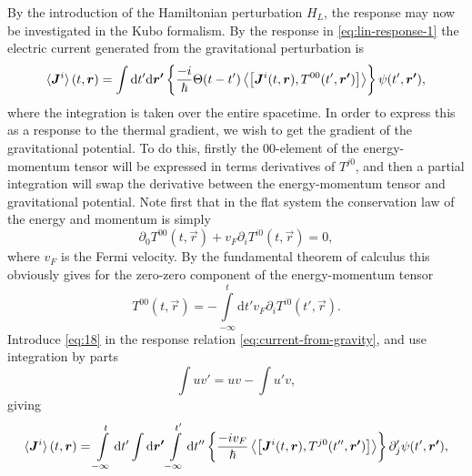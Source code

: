 By the introduction of the Hamiltonian perturbation $H_L$, the response may now be investigated in the Kubo formalism.
By the response in \cref{eq:lin-response-1} the electric current generated from the gravitational perturbation is
\begin{equation}
  \label{eq:current-from-gravity}
  \braket{\bm{J}^i}(t, \bm{r}) =
\int \mathrm{d}t' \mathrm{d} \bm{r'} \left\{
  \frac{-i}{\hbar} \Theta(t-t') \Braket{\left[
\bm{J}^i(t, \bm{r}), T^{00}(t', \bm{r'})
    \right]}
\right\} 
\psi (t', \bm{r'}),
\end{equation}
where the integration is taken over the entire spacetime.
In order to express this as a response to the thermal gradient, we wish to get the gradient of the gravitational potential.
To do this, firstly the $00$-element of the energy-momentum tensor will be expressed in terms derivatives of $T^{j0}$, and then a partial integration will swap the derivative between the energy-momentum tensor and gravitational potential.
Note first that in the flat system the conservation law of the  energy and momentum is simply
\begin{equation}
  \partial _0 T^{00}(t, \vec{r}) + v_F \partial _i T^{i0} (t, \vec{r}) = 0,
\end{equation}
where $v_F$ is the Fermi velocity.
By the fundamental theorem of calculus this obviously gives for the zero-zero component of the energy-momentum tensor
\begin{equation}
  \label{eq:18}
  T^{00}(t, \vec{r}) = - \int\limits_{-\infty }^t \mathrm{d}t'
  v_F \partial _i T^{i 0}(t', \vec{r}).
\end{equation}
Introduce \cref{eq:18} in the response relation \cref{eq:current-from-gravity}, and use integration by parts
\begin{equation}
  \int u v' = uv - \int u' v,
\end{equation}
giving
\begin{equation}\label{eq:current-luttinger-gravity-final}
  \braket{\bm{J}^i}(t, \bm{r}) =
  \int\limits_{-\infty}^{t} \mathrm{d}t'
  \int \mathrm{d} \bm{r'}
  \int\limits_{-\infty }^{t'} \mathrm{d}t''
  \left\{
    \frac{-i v_{F}}{\hbar} \Braket{\left[
        \bm{J}^i(t, \bm{r}), T^{j0}(t'', \bm{r'})
      \right]}
  \right\} 
  \partial'_j \psi (t', \bm{r'}),
\end{equation}

